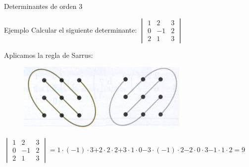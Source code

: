 \documentclass[9pt]{beamer}
\begin{document}
\begin{frame}{Determinantes de orden 3}
\begin{exampleblock}{Ejemplo}
Calcular el siguiente determinante:
$\begin{vmatrix}1&2&3\\
0&-1&2\\
2&1&3
\end{vmatrix}$
\end{exampleblock}
\pause
Aplicamos la regla de Sarrus:

\begin{figure}[h]
\includegraphics[scale=0.7]{imagenes/sarrus.jpg}
\end{figure}


$\begin{vmatrix}1&2&3\\
0&-1&2\\
2&1&3
\end{vmatrix}$\pause $=1\cdot (-1) \cdot 3$\pause $ +2\cdot 2 \cdot 2$\pause $+ 3\cdot 1 \cdot 0 $\pause  $-3\cdot (-1)\cdot 2 $\pause $- 2\cdot 0\cdot 3 $\pause $- 1\cdot 1 \cdot 2$\pause $=9$

\end{frame}
\end{document}
